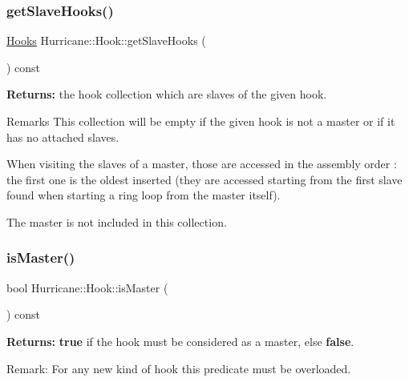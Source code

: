 \subsubsection{\texorpdfstring{get\+Slave\+Hooks()}{getSlaveHooks()}}
{\footnotesize\ttfamily \mbox{\hyperlink{namespaceHurricane_a9dcd9b74dc5e2b51bec7a13c25807e02}{Hooks}} Hurricane\+::\+Hook\+::get\+Slave\+Hooks (\begin{DoxyParamCaption}{ }\end{DoxyParamCaption}) const}

{\bfseries Returns\+:} the hook collection which are slaves of the given hook.

\begin{DoxyRemark}{Remarks}
This collection will be empty if the given hook is not a master or if it has no attached slaves.
\end{DoxyRemark}
When visiting the slaves of a master, those are accessed in the assembly order \+: the first one is the oldest inserted (they are accessed starting from the first slave found when starting a ring loop from the master itself).

The master is not included in this collection. \mbox{\label{classHurricane_1_1Hook_af0940eb0761f05df0b82c4198e22a01c}} 
\subsubsection{\texorpdfstring{is\+Master()}{isMaster()}}
{\footnotesize\ttfamily bool Hurricane\+::\+Hook\+::is\+Master (\begin{DoxyParamCaption}{ }\end{DoxyParamCaption}) const\hspace{0.3cm}{\ttfamily [pure virtual]}}

{\bfseries Returns\+:} {\bfseries true} if the hook must be considered as a master, else {\bfseries false}.

\begin{DoxyParagraph}{Remark\+: For any new kind of hook this predicate must be overloaded. }

\end{DoxyParagraph}
\mbox{\label{classHurricane_1_1Hook_acd62c7de2c023a1013d5a728159d068d}} 
